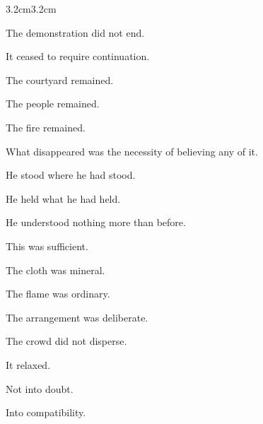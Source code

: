 \begin{adjustwidth}{3.2cm}{3.2cm}

The demonstration did not end.

\medskip

It ceased to require continuation.

\vspace{1em}

The courtyard remained.

\medskip

The people remained.

\medskip

The fire remained.

\vspace{1em}

What disappeared was the necessity of believing any of it.

\vspace{2em}

He stood where he had stood.

\medskip

He held what he had held.

\medskip

He understood nothing more than before.

\vspace{1em}

This was sufficient.

\vspace{2em}

The cloth was mineral.

\medskip

The flame was ordinary.

\medskip

The arrangement was deliberate.

\medskip


\vspace{2em}

The crowd did not disperse.

\medskip

It relaxed.

\medskip

Not into doubt.

\medskip

Into compatibility.

\vspace{1em}



\end{adjustwidth}
